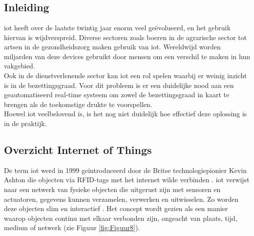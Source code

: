 

\chapter{}%
\label{ch:stand-van-zaken}

\section{Inleiding}
\gls{iot} heeft over de laatste twintig jaar enorm veel geëvolueerd, en het gebruik hiervan is wijdverspreid. Diverse sectoren zoals boeren in de agrarische sector tot artsen in de gezondheidszorg maken gebruik van \gls{iot}. Wereldwijd worden miljarden van deze devices gebruikt door mensen om een verschil te maken in hun vakgebied. \\

Ook in de dienstverlenende sector kan \gls{iot} een rol spelen waarbij er weinig inzicht is in de bezettingsgraad. Voor dit probleem is er een duidelijke nood aan een geautomatiseerd real-time systeem om zowel de bezettingsgraad in kaart te brengen als de toekomstige drukte te voorspellen. \\

Hoewel \gls{iot} veelbelovend is, is het nog niet duidelijk hoe effectief deze oplossing is in de praktijk.




\section{Overzicht Internet of Things}
De term \gls{iot} werd in 1999 geïntroduceerd door de Britse technologiepionier Kevin Ashton die objecten via RFID-tags met het internet wilde verbinden \autocite{Bassi2013, Rejeb2023}. \gls{iot} verwijst naar een netwerk van fysieke objecten die uitgerust zijn met sensoren en actuatoren, gegevens kunnen verzamelen, verwerken en uitwisselen. Zo worden deze objecten slim en interactief \autocite{Elksasy2023}. Het concept wordt gezien als een manier waarop objecten continu met elkaar verbonden zijn, ongeacht van plaats, tijd, medium of netwerk (zie Figuur \ref{fig:Figuur8}).

